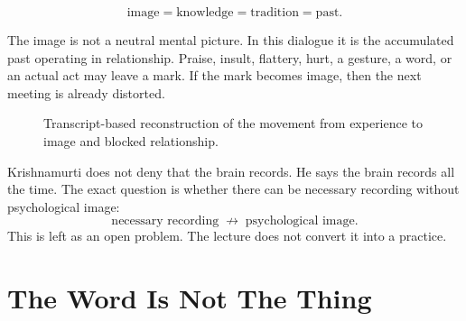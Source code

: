 \documentclass[11pt,oneside]{book}
\begin{document}
\begin{equation}
\text{image}
=
\text{knowledge}
=
\text{tradition}
=
\text{past}.
\end{equation}

The image is not a neutral mental picture. In this dialogue it is the accumulated past operating in relationship. Praise, insult, flattery, hurt, a gesture, a word, or an actual act may leave a mark. If the mark becomes image, then the next meeting is already distorted.

\begin{figure}
\centering
{}

Transcript-based reconstruction of the movement from experience to image and blocked relationship.
\end{figure}

Krishnamurti does not deny that the brain records. He says the brain records all the time. The exact question is whether there can be necessary recording without psychological image:
\begin{equation}
\text{necessary recording}
\;\not\longrightarrow\;
\text{psychological image}.
\end{equation}
This is left as an open problem. The lecture does not convert it into a practice.

\section{The Word Is Not The Thing}
\end{document}
